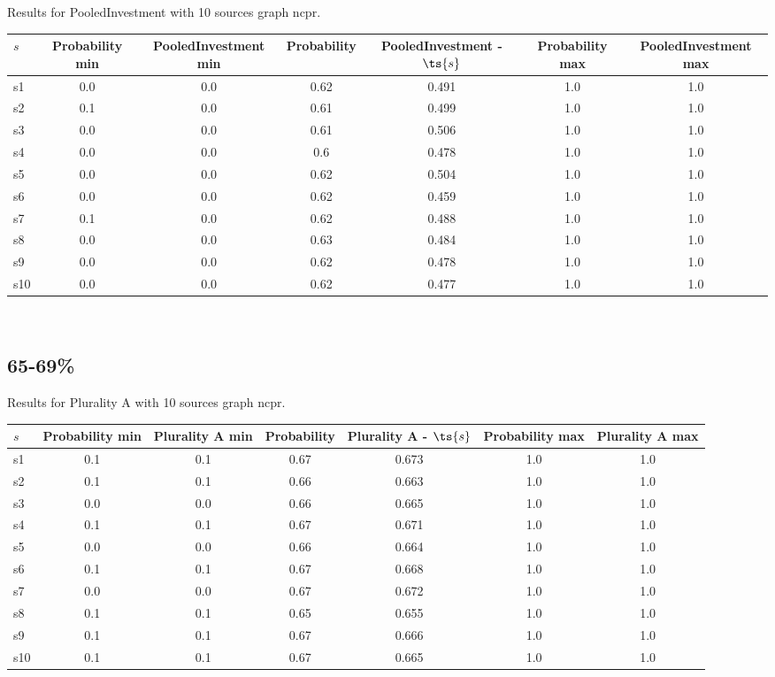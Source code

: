 \documentclass{article}
\begin{document}
\noindent Results for PooledInvestment with 10 sources graph ncpr.

\noindent\begin{tabular}{|l|c|c|c|c|c|c|}
\hline
$s$& Probability min & PooledInvestment min & Probability & PooledInvestment - $\ts{s}$ & Probability max & PooledInvestment max\\
\hline
s1 &0.0 & 0.0 & 0.62 & 0.491 & 1.0 & 1.0\\
\hline
s2 &0.1 & 0.0 & 0.61 & 0.499 & 1.0 & 1.0\\
\hline
s3 &0.0 & 0.0 & 0.61 & 0.506 & 1.0 & 1.0\\
\hline
s4 &0.0 & 0.0 & 0.6 & 0.478 & 1.0 & 1.0\\
\hline
s5 &0.0 & 0.0 & 0.62 & 0.504 & 1.0 & 1.0\\
\hline
s6 &0.0 & 0.0 & 0.62 & 0.459 & 1.0 & 1.0\\
\hline
s7 &0.1 & 0.0 & 0.62 & 0.488 & 1.0 & 1.0\\
\hline
s8 &0.0 & 0.0 & 0.63 & 0.484 & 1.0 & 1.0\\
\hline
s9 &0.0 & 0.0 & 0.62 & 0.478 & 1.0 & 1.0\\
\hline
s10 &0.0 & 0.0 & 0.62 & 0.477 & 1.0 & 1.0\\
\hline
\end{tabular}\\

\newpage

\subsection{65-69\%}

\noindent Results for Plurality A with 10 sources graph ncpr.

\noindent\begin{tabular}{|l|c|c|c|c|c|c|}
\hline
$s$& Probability min & Plurality A min & Probability & Plurality A - $\ts{s}$ & Probability max & Plurality A max\\
\hline
s1 &0.1 & 0.1 & 0.67 & 0.673 & 1.0 & 1.0\\
\hline
s2 &0.1 & 0.1 & 0.66 & 0.663 & 1.0 & 1.0\\
\hline
s3 &0.0 & 0.0 & 0.66 & 0.665 & 1.0 & 1.0\\
\hline
s4 &0.1 & 0.1 & 0.67 & 0.671 & 1.0 & 1.0\\
\hline
s5 &0.0 & 0.0 & 0.66 & 0.664 & 1.0 & 1.0\\
\hline
s6 &0.1 & 0.1 & 0.67 & 0.668 & 1.0 & 1.0\\
\hline
s7 &0.0 & 0.0 & 0.67 & 0.672 & 1.0 & 1.0\\
\hline
s8 &0.1 & 0.1 & 0.65 & 0.655 & 1.0 & 1.0\\
\hline
s9 &0.1 & 0.1 & 0.67 & 0.666 & 1.0 & 1.0\\
\hline
s10 &0.1 & 0.1 & 0.67 & 0.665 & 1.0 & 1.0\\
\hline
\end{tabular}\\
\end{document}
